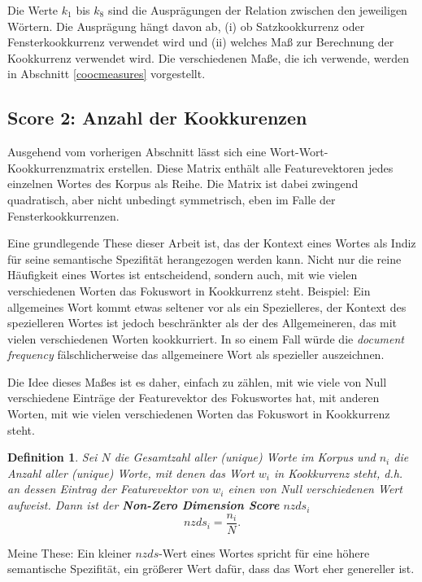\documentclass[11pt,numbers=noenddot]{scrartcl}
\newtheorem*{defi}{Definition}
\begin{document}
Die Werte $k_1$ bis $k_8$ sind die Ausprägungen der Relation zwischen den jeweiligen Wörtern. Die Ausprägung hängt davon ab, (i) ob Satzkookkurrenz oder Fensterkookkurrenz verwendet wird und (ii) welches Maß zur Berechnung der Kookkurrenz verwendet wird. Die verschiedenen Maße, die ich verwende, werden in Abschnitt \ref{coocmeasures} vorgestellt.

\subsection{Score 2: Anzahl der Kookkurenzen} \label{nzds}

Ausgehend vom vorherigen Abschnitt lässt sich eine Wort-Wort-Kookkurrenzmatrix erstellen. Diese Matrix enthält alle Featurevektoren jedes einzelnen Wortes des Korpus als Reihe. Die Matrix ist dabei zwingend quadratisch, aber nicht unbedingt symmetrisch, eben im Falle der Fensterkookkurrenzen.

Eine grundlegende These dieser Arbeit ist, das der Kontext eines Wortes als Indiz für seine semantische Spezifität herangezogen werden kann. Nicht nur die reine Häufigkeit eines Wortes ist entscheidend, sondern auch, mit wie vielen verschiedenen Worten das Fokuswort in Kookkurrenz steht. Beispiel: Ein allgemeines Wort kommt etwas seltener vor als ein Spezielleres, der Kontext des spezielleren Wortes ist jedoch beschränkter als der des Allgemeineren, das mit vielen verschiedenen Worten kookkurriert. In so einem Fall würde die \emph{document frequency} fälschlicherweise das allgemeinere Wort als spezieller auszeichnen.

Die Idee dieses Maßes ist es daher, einfach zu zählen, mit wie viele von Null verschiedene Einträge der Featurevektor des Fokuswortes hat, mit anderen Worten, mit wie vielen verschiedenen Worten das Fokuswort in Kookkurrenz steht.

\begin{defi}
Sei $N$ die Gesamtzahl aller (unique) Worte im Korpus und $n_i$ die Anzahl aller (unique) Worte, mit denen das Wort $w_i$ in Kookkurrenz steht, d.h. an dessen Eintrag der Featurevektor von $w_i$ einen von Null verschiedenen Wert aufweist. Dann ist der \textbf{Non-Zero Dimension Score} $nzds_i$
\begin{equation}
    nzds_i = \frac{n_i}{N}.
\end{equation}
\end{defi}

Meine These: Ein kleiner $nzds$-Wert eines Wortes spricht für eine höhere semantische Spezifität, ein größerer Wert dafür, dass das Wort eher genereller ist.
\end{document}
